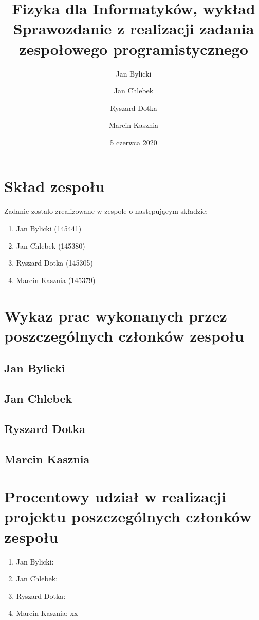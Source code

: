 \documentclass{article}
\title{Fizyka dla Informatyków, wykład\\ Sprawozdanie z realizacji zadania zespołowego programistycznego}
\author{Jan Bylicki \and Jan Chlebek \and Ryszard Dotka \and Marcin Kasznia}
\date{5 czerwca 2020}
\begin{document}
\maketitle

\section{Skład zespołu}
Zadanie zostalo zrealizowane w zespole o następującym składzie:
\begin{enumerate}
    \item Jan Bylicki (145441)
    \item Jan Chlebek (145380)
    \item Ryszard Dotka (145305)
    \item Marcin Kasznia (145379)
\end{enumerate}

\section{Wykaz prac wykonanych przez poszczególnych członków zespołu}
    \subsection{Jan Bylicki}
    \subsection{Jan Chlebek}
    \subsection{Ryszard Dotka}
    \subsection{Marcin Kasznia}

\section{Procentowy udział w realizacji projektu poszczególnych członków zespołu}
\begin{enumerate}
    \item Jan Bylicki:
    \item Jan Chlebek:
    \item Ryszard Dotka:
    \item Marcin Kasznia: xx 
\end{enumerate}
\end{document}
